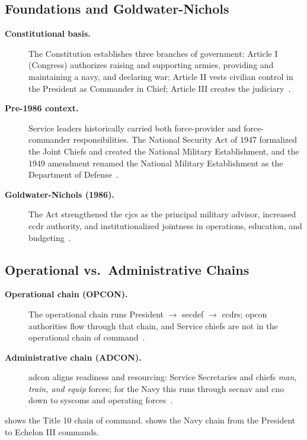\documentclass[../main.tex]{subfiles}
\begin{document}
\subsection{Foundations and Goldwater-Nichols}
\begin{description}
  \item[\textbf{Constitutional basis.}] The Constitution establishes three branches of government: Article I (Congress) authorizes raising and supporting armies, providing and maintaining a navy, and declaring war; Article II vests civilian control in the President as Commander in Chief; Article III creates the judiciary~\autocite{edo-2-1-1-command-structures-2025}.
  \item[\textbf{Pre-1986 context.}] Service leaders historically carried both force-provider and force-commander responsibilities. The National Security Act of 1947 formalized the Joint Chiefs and created the National Military Establishment, and the 1949 amendment renamed the National Military Establishment as the Department of Defense~\autocite{edo-2-1-1-command-structures-2025,DoW-Historic-Highlights-2026}.
  \item[\textbf{Goldwater-Nichols (1986).}] The Act strengthened the \ac{cjcs} as the principal military advisor, increased \ac{ccdr} authority, and institutionalized jointness in operations, education, and budgeting~\autocite{Goldwater-Nichols-1986,edo-2-1-1-command-structures-2025}.
\end{description}

\subsection{Operational vs.\ Administrative Chains}
\begin{description}
  \item[\textbf{Operational chain (OPCON).}] The operational chain runs President \(\to\) \ac{secdef} \(\to\) \acp{ccdr}; \ac{opcon} authorities flow through that chain, and Service chiefs are not in the operational chain of command~\autocite{USC-113,USC-162}.
  \item[\textbf{Administrative chain (ADCON).}] \ac{adcon} aligns readiness and resourcing: Service Secretaries and chiefs \emph{man, train, and equip} forces; for the Navy this runs through \ac{secnav} and \ac{cno} down to \acp{syscom} and operating forces~\autocite{USC-8032,edo-2-1-1-command-structures-2025}.
\end{description}

\Fig{\ref{fig:chain_of_command_ops}} shows the Title 10 chain of command. \Fig{\ref{fig:chain_of_command_org_chart}} shows the Navy chain from the President to Echelon III commands.
\end{document}
